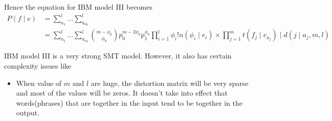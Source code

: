 Hence the equation for IBM model III becomes
\begin{align}
P(f\mid e) &= \sum_{a_{1}}^{l}\ldots \sum_{a_{m}}^{l}\nonumber \\
		   &= \sum_{a_{1}}^{l}\ldots \sum_{a_{m}}^{l}\binom{m-\phi_{0}}{\phi_{0}}p_{0}^{m-2\phi_{0}}p_{1}^{\phi_{0}}\prod_{i=1}^{l}\phi_{i}!n(\phi_{i}\mid e_{i})\times \prod_{j=1}^{m}t(f_{j}\mid e_{a_{j}})\mid d(j\mid a_{j},m,l)
\end{align}

IBM model III is a very strong SMT model. However, it also has certain complexity issues like
\begin{itemize}
\item When value of $m$ and $l$ are huge, the distortion matrix will be very sparse and most of the values will be zeros. It doesn't take into effect that words(phrases) that are together in the input tend to be together in the output.
\end{itemize}




















